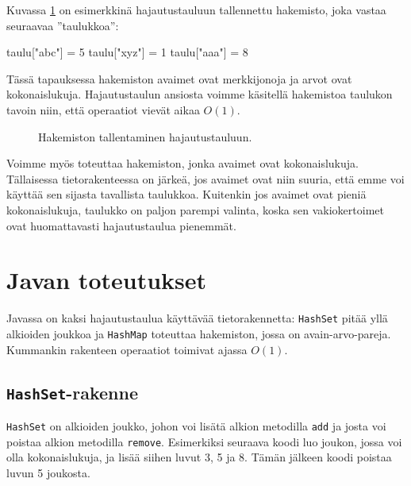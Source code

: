 Kuvassa \ref{fig:hajhak} on esimerkkinä hajautustauluun
tallennettu hakemisto, joka vastaa seuraavaa ''taulukkoa'':

\begin{code}
taulu["abc"] = 5
taulu["xyz"] = 1
taulu["aaa"] = 8
\end{code}

Tässä tapauksessa hakemiston avaimet ovat merkkijonoja
ja arvot ovat kokonaislukuja.
Hajautustaulun ansiosta voimme käsitellä hakemistoa
taulukon tavoin niin, että operaatiot vievät aikaa $O(1)$.

\begin{figure}
\center
{}
\caption{Hakemiston tallentaminen hajautustauluun.}
\label{fig:hajhak}
\end{figure}

Voimme myös toteuttaa hakemiston, jonka avaimet ovat kokonaislukuja.
Tällaisessa tietorakenteessa on järkeä, jos avaimet ovat niin suuria,
että emme voi käyttää sen sijasta tavallista taulukkoa.
Kuitenkin jos avaimet ovat pieniä kokonaislukuja,
taulukko on paljon parempi valinta, koska sen vakiokertoimet
ovat huomattavasti hajautustaulua pienemmät.

\section{Javan toteutukset}

Javassa on kaksi hajautustaulua käyttävää tietorakennetta:
\texttt{HashSet} pitää yllä alkioiden joukkoa
ja \texttt{HashMap} toteuttaa
hakemiston, jossa on avain-arvo-pareja.
Kummankin rakenteen operaatiot toimivat ajassa $O(1)$.

\subsection{\texttt{HashSet}-rakenne}

\texttt{HashSet} on alkioiden joukko,
johon voi lisätä alkion metodilla \texttt{add}
ja josta voi poistaa alkion metodilla \texttt{remove}.
Esimerkiksi seuraava koodi luo joukon, jossa voi olla
kokonaislukuja, ja lisää siihen luvut 3, 5 ja 8.
Tämän jälkeen koodi poistaa luvun 5 joukosta.

